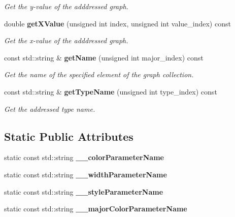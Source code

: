 \begin{DoxyCompactItemize}
\begin{DoxyCompactList}\small\item\em Get the y-\/value of the adddressed graph. \item\end{DoxyCompactList}\item 
double {\bf getXValue} (unsigned int index, unsigned int value\_\-index) const \label{classhistmgr_1_1GraphCollection__t_a7dd9e9ac73e5e5ba7bf9f2786a73af0b}

\begin{DoxyCompactList}\small\item\em Get the x-\/value of the adddressed graph. \item\end{DoxyCompactList}\item 
const std::string \& {\bf getName} (unsigned int major\_\-index) const 
\begin{DoxyCompactList}\small\item\em Get the name of the specified element of the graph collection. \item\end{DoxyCompactList}\item 
const std::string \& {\bf getTypeName} (unsigned int type\_\-index) const 
\begin{DoxyCompactList}\small\item\em Get the addressed type name. \item\end{DoxyCompactList}\end{DoxyCompactItemize}
\subsection*{Static Public Attributes}
\begin{DoxyCompactItemize}
\item 
static const std::string {\bfseries \_\-\_\-colorParameterName}\label{classhistmgr_1_1GraphCollection__t_a1934a2578324612aa48e561e45058694}

\item 
static const std::string {\bfseries \_\-\_\-widthParameterName}\label{classhistmgr_1_1GraphCollection__t_ac0f6932a278f313baffc9939f4cb06b3}

\item 
static const std::string {\bfseries \_\-\_\-styleParameterName}\label{classhistmgr_1_1GraphCollection__t_acd025c2ba443992253384db6a7d17a8e}

\item 
static const std::string {\bfseries \_\-\_\-majorColorParameterName}\label{classhistmgr_1_1GraphCollection__t_a8dfd0bff85a2211a1e7090aa43506c4d}

\end{DoxyCompactItemize}
